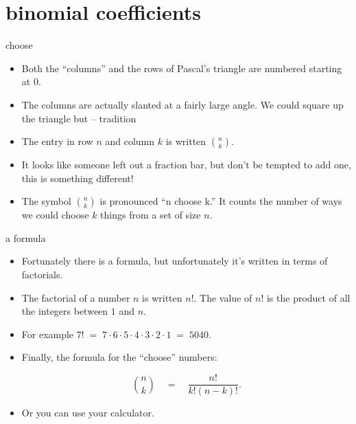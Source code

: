 \documentclass[landscape]{beamer}
\begin{document}
\section{binomial coefficients}



\begin{frame}{choose}
\begin{itemize}
\item Both the ``columns'' and the rows of Pascal's triangle are numbered starting at 0. \pause
\item The columns are actually slanted at a fairly large angle.  We could square up the triangle but -- tradition\textellipsis \pause
\item The entry in row $n$ and column $k$ is written $\displaystyle \binom{n}{k}$. \pause
\item It looks like someone left out a fraction bar, but don't be tempted to add one, this is something different! \pause
\item The symbol  $\displaystyle \binom{n}{k}$ is pronounced ``n choose k.''  It counts the number of ways we could choose $k$ things from a set of size $n$.
\end{itemize}
\end{frame}

\begin{frame}{a formula}
\begin{itemize}
\item Fortunately there is a formula, but unfortunately it's written in terms of factorials. \pause
\item The factorial of a number $n$ is written $n!$.  The value of $n!$ is the product of all the integers between $1$ and $n$. \pause
\item For example $7! \; = \; 7\cdot 6 \cdot 5 \cdot 4 \cdot 3 \cdot 2 \cdot 1 \; = \; 5040$. \pause 
\item Finally, the formula for the ``choose'' numbers:

\[ \binom{n}{k} \quad = \quad \frac{n!}{k! (n-k)!}. \]
\pause 
\item Or you can use your calculator. 
\end{itemize}
\end{frame}
\end{document}

